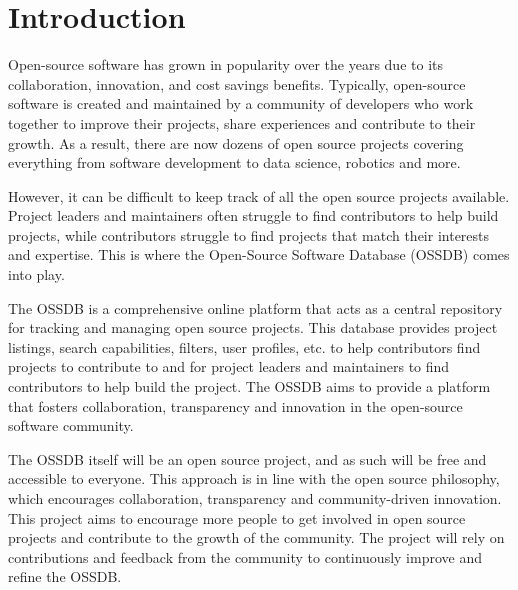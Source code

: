 \pagebreak
\section{Introduction}
Open-source software has grown in popularity over the years due to its collaboration, innovation, and cost savings benefits.
Typically, open-source software is created and maintained by a community of developers who work together to improve their projects, share experiences and contribute to their growth.
As a result, there are now dozens of open source projects covering everything from software development to data science, robotics and more.

However, it can be difficult to keep track of all the open source projects available.
Project leaders and maintainers often struggle to find contributors to help build projects, while contributors struggle to find projects that match their interests and expertise.
This is where the Open-Source Software Database (OSSDB) comes into play.

The OSSDB is a comprehensive online platform that acts as a central repository for tracking and managing open source projects.
This database provides project listings, search capabilities, filters, user profiles, etc. to help contributors find projects to contribute to
and for project leaders and maintainers to find contributors to help build the project.
The OSSDB aims to provide a platform that fosters collaboration, transparency and innovation in the open-source software community.

The OSSDB itself will be an open source project, and as such will be free and accessible to everyone.
This approach is in line with the open source philosophy, which encourages collaboration, transparency and community-driven innovation.
This project aims to encourage more people to get involved in open source projects and contribute to the growth of the community.
The project will rely on contributions and feedback from the community to continuously improve and refine the OSSDB.
